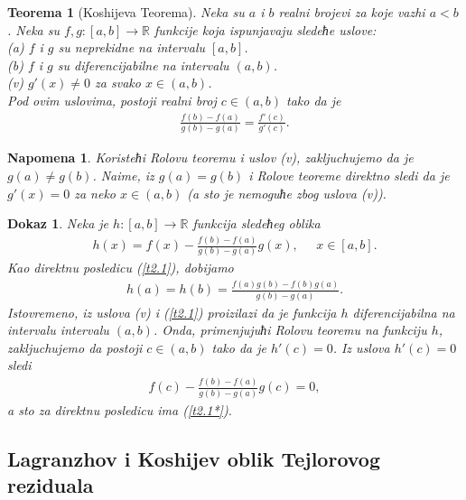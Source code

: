 \documentclass[12pt,a4paper]{article}
\newtheorem{thm}{Teorema}%
\newtheorem*{nap}{Napomena}
\newtheorem*{dokaz}{Dokaz}
\begin{document}
 
 \begin{thm}[Koshijeva Teorema]\label{thm2}
 Neka su $a$ i $b$ realni brojevi za koje vazhi $a<b$. 
 Neka su $f,g:[a,b]\rightarrow\mathbb{R}$ funkcije 
 koja ispunjavaju sledeћe uslove: 
 \\
 (a) $f$ i $g$ su neprekidne na intervalu $[a,b]$.
 \\
 (b) $f$ i $g$ su diferencijabilne na intervalu 
 $(a,b)$. 
 \\
 (v) $g'(x)\neq 0$ za svako $x\in(a,b)$. 
 \\
 Pod ovim uslovima, 
 postoji realni broj $c\in(a,b)$ tako da je 
 \begin{align}\label{t2.1*}
     \frac{f(b)-f(a)}{g(b)-g(a)}
     =
     \frac{f'(c)}{g'(c)}. 
 \end{align}
 \end{thm}
 
 \begin{nap}
 Koristeћi Rolovu teoremu i uslov (v), 
 zakljuchujemo da je $g(a)\neq g(b)$. 
 Naime, iz $g(a)=g(b)$ i Rolove teoreme direktno sledi 
 da je $g'(x)=0$ za neko $x\in(a,b)$ (a sto je nemoguћe zbog uslova (v)). 
 \end{nap}
 
 \begin{dokaz}
 Neka je $h:[a,b]\rightarrow\mathbb{R}$ funkcija sledeћeg oblika
 \begin{align}\label{t2.1}
     h(x)
     =
     f(x)
     -
     \frac{f(b)-f(a)}{g(b)-g(a)}g(x), 
     \;\;\;\;\; x\in[a,b]. 
 \end{align}
 Kao direktnu posledicu (\ref{t2.1}), dobijamo  
 \begin{align*}
     h(a)=h(b)
     =
     \frac{f(a)g(b)-f(b)g(a)}{g(b)-g(a)}. 
 \end{align*}
 Istovremeno, iz uslova (v) i (\ref{t2.1})
 proizilazi da je funkcija $h$ diferencijabilna na intervalu
 intervalu $(a,b)$. 
 Onda, primenjujuћi Rolovu teoremu na funkciju $h$, 
 zakljuchujemo da postoji $c\in(a,b)$ tako da je 
 $h'(c)=0$. 
 Iz uslova $h'(c)=0$ sledi 
 \begin{align*}
    f(c)
     -
     \frac{f(b)-f(a)}{g(b)-g(a)}g(c)
     =0, 
\end{align*}
a sto za direktnu posledicu ima (\ref{t2.1*}). 
 \end{dokaz}
 
 \subsection{Lagranzhov i Koshijev oblik Tejlorovog reziduala}
 
\end{document}

